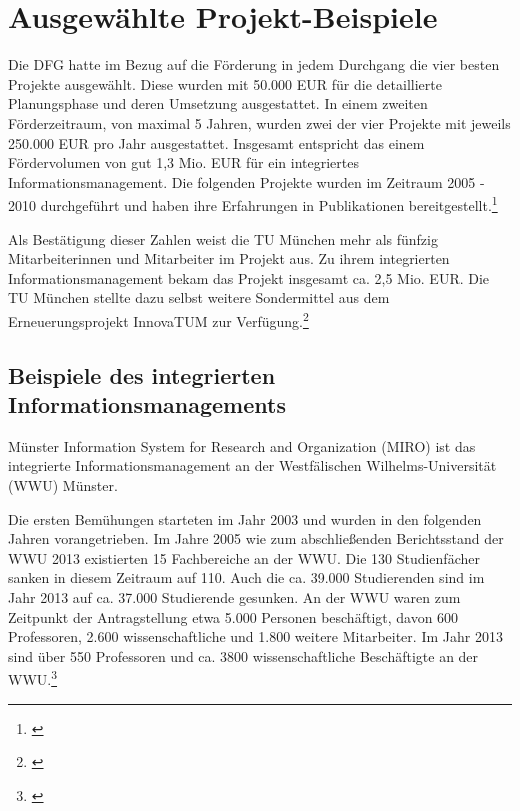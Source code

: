 \section{Ausgewählte Projekt-Beispiele}
\label{section_projekt_beispiele}
Die DFG hatte im Bezug auf die Förderung in jedem Durchgang die vier besten Projekte ausgewählt.
Diese wurden mit 50.000 EUR für die detaillierte Planungsphase und deren Umsetzung ausgestattet.
In einem zweiten Förderzeitraum, von maximal 5 Jahren, wurden zwei der vier Projekte mit jeweils 250.000 EUR pro Jahr ausgestattet.
Insgesamt entspricht das einem Fördervolumen von gut 1,3 Mio. EUR für ein integriertes Informationsmanagement.
Die folgenden Projekte wurden im Zeitraum 2005 - 2010 durchgeführt und haben ihre Erfahrungen in Publikationen bereitgestellt.\footnote{\cite{kerres_hochschulen_2005}}

Als Bestätigung dieser Zahlen weist die TU München mehr als fünfzig Mitarbeiterinnen und Mitarbeiter im Projekt aus. Zu ihrem integrierten Informationsmanagement bekam das Projekt insgesamt ca. 2,5 Mio. EUR. Die TU München stellte dazu selbst weitere Sondermittel aus dem Erneuerungsprojekt InnovaTUM zur Verfügung.\footnote{\cite{bode_informationsmanagement_2010}}

\subsection{Beispiele des integrierten Informationsmanagements}
Münster Information System for Research and Organization (MIRO) ist das integrierte Informationsmanagement an der Westfälischen Wilhelms-Universität  (WWU) Münster.

Die ersten Bemühungen starteten im Jahr 2003 und wurden in den folgenden Jahren vorangetrieben. Im Jahre 2005 wie zum abschließenden Berichtsstand der WWU 2013 existierten 15 Fachbereiche an der WWU. Die 130 Studienfächer sanken in diesem Zeitraum auf 110. Auch die ca. 39.000 Studierenden sind im Jahr 2013 auf ca. 37.000 Studierende gesunken. An der WWU waren zum Zeitpunkt der Antragstellung etwa 5.000 Personen beschäftigt, davon 600 Professoren, 2.600 wissenschaftliche und 1.800 weitere Mitarbeiter. Im Jahr 2013 sind über 550 Professoren und ca. 3800 wissenschaftliche Beschäftigte an der WWU.\footnote{\cite{vogl_bericht_2013}}

